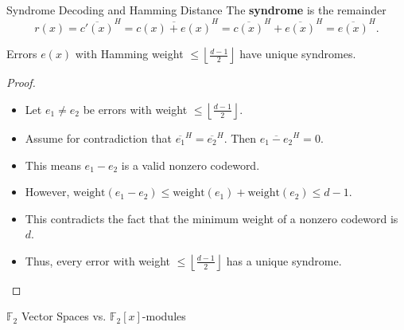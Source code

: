 \documentclass[handout]{beamer}
\begin{document}
\begin{frame}{Syndrome Decoding and Hamming Distance}
    The \textbf{syndrome} is the remainder 
    \[r(x) = \overline{c'(x)}^H= \overline{c(x)+e(x)}^H= \overline{c(x)}^H+\overline{e(x)}^H=\overline{e(x)}^H.\]
    \begin{theorem}
        Errors $e(x)$ with Hamming weight $\le \left\lfloor \frac{d-1}{2} \right\rfloor$ have unique syndromes.
    \end{theorem}
    \begin{proof}
    \begin{itemize}
        \item Let $e_1 \neq e_2$ be errors with weight $\le \left\lfloor \frac{d-1}{2} \right\rfloor$.
        \item Assume for contradiction that $\overline{e_1}^H = \overline{e_2}^H$. Then $\overline{e_1 - e_2}^H = 0$.
        \item This means $e_1 - e_2$ is a valid nonzero codeword.
        \item However, $\text{weight}(e_1 - e_2) \le \text{weight}(e_1) + \text{weight}(e_2) \le d-1$.
        \item This contradicts the fact that the minimum weight of a nonzero codeword is $d$.
        \item Thus, every error with weight $\le \left\lfloor \frac{d-1}{2} \right\rfloor$ has a unique syndrome.
    \end{itemize}
    \end{proof}
\end{frame}

\begin{frame}[t]{$\mathbb F_2$ Vector Spaces vs. $\mathbb F_2[x]$-modules}
    \begin{figure}
        \centering
    \end{figure}
\end{frame}
\end{document}
